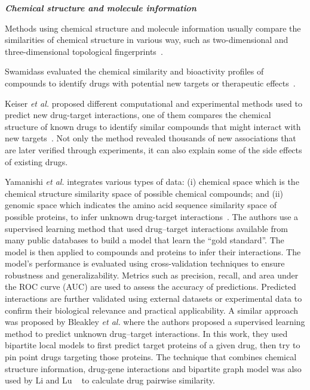 \documentclass[Minh_PhD_thesis.tex]{subfiles}
\begin{document}
\textit{\textbf{Chemical structure and molecule information}}

Methods using chemical structure and molecule information usually compare the similarities of chemical structure in various way, such as two-dimensional and three-dimensional topological fingerprints~\cite{rognan2007chemogenomic, pihan2012drug3d, novick2013sweetlead}.

Swamidass evaluated the chemical similarity and bioactivity profiles of compounds to identify drugs with potential new targets or therapeutic effects~\cite{swamidass2011mining}. 

Keiser \textit{et  al.}  proposed different computational and experimental methods used to predict new drug-target interactions, one of them compares the chemical structure of known drugs to identify similar compounds that might interact with new targets~\cite{keiser2009predicting}.  Not only the method revealed thousands of new associations that are later verified through experiments, it can also explain some of the side effects of existing drugs.

Yamanishi \textit{et  al.} integrates various types of data: (i) chemical space which is the chemical structure similarity space of possible chemical compounds; and (ii) genomic space which indicates the amino acid sequence similarity space of possible proteins, to infer unknown drug-target interactions~\cite{bleakley2009supervised}. The authors use a supervised learning method that used  drug–target interactions available from many public databases to build a model that learn the ``gold standard''. The model is then applied to compounds and proteins to infer their interactions. The model’s performance is evaluated using cross-validation techniques to ensure robustness and generalizability. Metrics such as precision, recall, and area under the ROC curve (AUC) are used to assess the accuracy of predictions. Predicted interactions are further validated using external datasets or experimental data to confirm their biological relevance and practical applicability.
A similar approach was proposed by Bleakley \textit{et al.} where the authors proposed a supervised learning method to predict unknown drug–target interactions. In this work, they used bipartite local models to first predict target proteins of a given drug, then try to pin point drugs targeting those proteins.
The technique that combines chemical structure information, drug-gene interactions and bipartite graph model was also used by Li and Lu ~\cite{li2012new} to calculate drug pairwise similarity.
\end{document}
